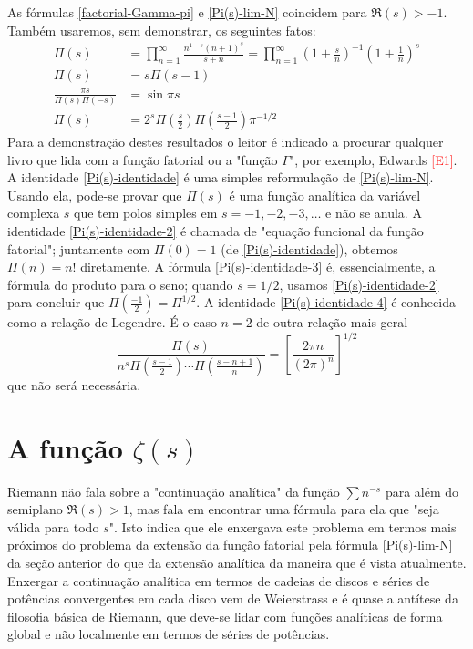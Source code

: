     As fórmulas \eqref{factorial-Gamma-pi} e \eqref{Pi(s)-lim-N} coincidem para $\Re(s)> -1$. Também usaremos, sem demonstrar, os seguintes fatos:
    \begin{align}
        \Pi(s) &= \prod_{n=1}^{\infty}\frac{n^{1-s}(n+1)^s}{s+n} =  \prod_{n=1}^{\infty}\left(1 + \frac{s}{n}\right)^{-1} \left(1 + \frac{1}{n}\right)^{s} \label{Pi(s)-identidade} \\[0.3cm]
        \Pi(s) &= s\Pi(s-1) \label{Pi(s)-identidade-2} \\[0.3cm]
        \frac{\pi s}{\Pi(s)\Pi(-s)} &= \sin \pi s  \label{Pi(s)-identidade-3} \\[0.3cm]
        \Pi(s) &= 2^s\Pi\left(\frac{s}{2}\right)\Pi\left(\frac{s-1}{2}\right)\pi^{-1/2}
    \end{align}
    Para a demonstração destes resultados o leitor é indicado a procurar qualquer livro que lida com a função fatorial ou a "função $\Gamma$", por exemplo, Edwards \textcolor{red}{[E1]}. A identidade \eqref{Pi(s)-identidade} é uma simples reformulação de \eqref{Pi(s)-lim-N}. Usando ela, pode-se provar que $\Pi(s)$ é uma função analítica da variável complexa $s$ que tem polos simples em $s = -1, -2, -3, \dots$ e não se anula. A identidade \eqref{Pi(s)-identidade-2} é chamada de "equação funcional da função fatorial"; juntamente com $\Pi(0)=1$ (de \eqref{Pi(s)-identidade}), obtemos $\Pi(n) = n!$ diretamente. A fórmula \eqref{Pi(s)-identidade-3} é, essencialmente, a fórmula do produto para o seno; quando $s = 1/2$, usamos \eqref{Pi(s)-identidade-2} para concluir que $\Pi(\frac{-1}{2}) = \Pi^{1/2}$. A identidade \eqref{Pi(s)-identidade-4} é conhecida como a relação de Legendre. É o caso $n=2$ de outra relação mais geral
    \begin{equation*}
        \frac{\Pi(s)}{n^s \Pi\left( \frac{s-1}{2}\right) \cdots \Pi\left( \frac{s-n + 1}{n}\right)} 
        = \left[ \frac{2\pi n}{(2\pi)^n}\right]^{1/2}
    \end{equation*}
    que não será necessária.
    
    
    \section*{A função $\zeta(s)$}
    
    
    Riemann não fala sobre a "continuação analítica" da função $\sum n^{-s}$ para além do semiplano $\Re(s)>1$, mas fala em encontrar uma fórmula para ela que "seja válida para todo $s$". Isto indica que ele enxergava este problema em termos mais próximos do problema da extensão da função fatorial pela fórmula \eqref{Pi(s)-lim-N} da seção anterior do que da extensão analítica da maneira que é vista atualmente. Enxergar a continuação analítica em termos de cadeias de discos e séries de potências convergentes em cada disco vem de Weierstrass e é quase a antítese da filosofia básica de Riemann, que deve-se lidar com funções analíticas de forma global e não localmente em termos de séries de potências. 
    
